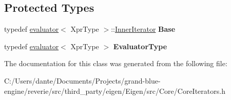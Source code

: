 \subsection*{Protected Types}
\begin{DoxyCompactItemize}
\item 
\mbox{\label{class_eigen_1_1internal_1_1inner__iterator__selector_3_01_xpr_type_00_01_iterator_based_01_4_abc08a7b1b33570a3650f91f499f1c303}} 
typedef \mbox{\hyperlink{struct_eigen_1_1internal_1_1evaluator}{evaluator}}$<$ Xpr\+Type $>$\+::\mbox{\hyperlink{class_eigen_1_1_inner_iterator}{Inner\+Iterator}} {\bfseries Base}
\item 
\mbox{\label{class_eigen_1_1internal_1_1inner__iterator__selector_3_01_xpr_type_00_01_iterator_based_01_4_a28c895cdf4870a02511a8eb5fcede040}} 
typedef \mbox{\hyperlink{struct_eigen_1_1internal_1_1evaluator}{evaluator}}$<$ Xpr\+Type $>$ {\bfseries Evaluator\+Type}
\end{DoxyCompactItemize}


The documentation for this class was generated from the following file\+:\begin{DoxyCompactItemize}
\item 
C\+:/\+Users/dante/\+Documents/\+Projects/grand-\/blue-\/engine/reverie/src/third\+\_\+party/eigen/\+Eigen/src/\+Core/Core\+Iterators.\+h\end{DoxyCompactItemize}

